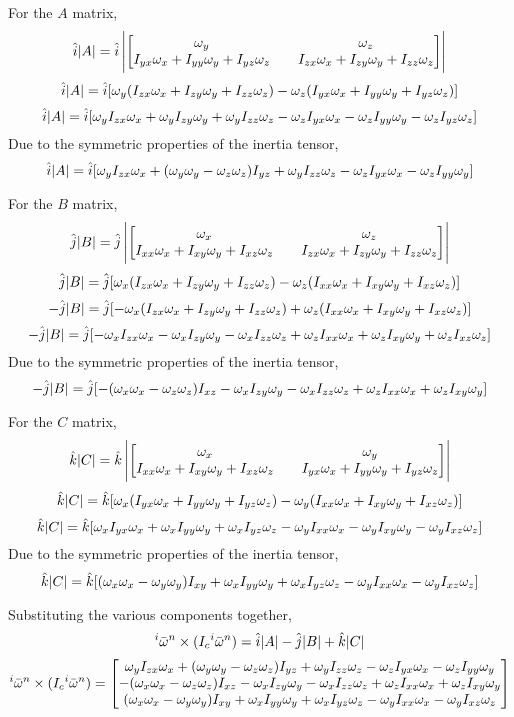 \documentclass[class=report, 12pt, crop=false]{standalone}
\begin{document}
\begin{center}
For the $A$ matrix,
$$\hat{i}|A| = \hat{i}\left|\begin{bmatrix}
\omega_y && \omega_z \\
I_{yx}\omega_x + I_{yy}\omega_y + I_{yz}\omega_z && I_{zx}\omega_x + I_{zy}\omega_y + I_{zz}\omega_z
\end{bmatrix}\right|$$
$$\hat{i}|A| = \hat{i}[\omega_y(I_{zx}\omega_x + I_{zy}\omega_y + I_{zz}\omega_z) - \omega_z(I_{yx}\omega_x + I_{yy}\omega_y + I_{yz}\omega_z)]$$
$$\hat{i}|A| = \hat{i}[\omega_yI_{zx}\omega_x + \omega_yI_{zy}\omega_y + \omega_yI_{zz}\omega_z - \omega_zI_{yx}\omega_x - \omega_zI_{yy}\omega_y - \omega_zI_{yz}\omega_z]$$
Due to the symmetric properties of the inertia tensor,
$$\hat{i}|A| = \hat{i}[\omega_yI_{zx}\omega_x + (\omega_y\omega_y - \omega_z\omega_z)I_{yz} + \omega_yI_{zz}\omega_z - \omega_zI_{yx}\omega_x - \omega_zI_{yy}\omega_y]$$

For the $B$ matrix,
$$\hat{j}|B| = \hat{j}\left|\begin{bmatrix}
\omega_x && \omega_z \\
I_{xx}\omega_x + I_{xy}\omega_y + I_{xz}\omega_z && I_{zx}\omega_x + I_{zy}\omega_y + I_{zz}\omega_z
\end{bmatrix}\right|$$
$$\hat{j}|B| = \hat{j}[\omega_x(I_{zx}\omega_x + I_{zy}\omega_y + I_{zz}\omega_z) - \omega_z(I_{xx}\omega_x + I_{xy}\omega_y + I_{xz}\omega_z)]$$
$$-\hat{j}|B| = \hat{j}[-\omega_x(I_{zx}\omega_x + I_{zy}\omega_y + I_{zz}\omega_z) + \omega_z(I_{xx}\omega_x + I_{xy}\omega_y + I_{xz}\omega_z)]$$
$$-\hat{j}|B| = \hat{j}[-\omega_xI_{zx}\omega_x - \omega_xI_{zy}\omega_y - \omega_xI_{zz}\omega_z + \omega_zI_{xx}\omega_x + \omega_zI_{xy}\omega_y + \omega_zI_{xz}\omega_z]$$
Due to the symmetric properties of the inertia tensor,
$$-\hat{j}|B| = \hat{j}[-(\omega_x\omega_x - \omega_z\omega_z)I_{xz} - \omega_xI_{zy}\omega_y - \omega_xI_{zz}\omega_z + \omega_zI_{xx}\omega_x + \omega_zI_{xy}\omega_y]$$

For the $C$ matrix,
$$\hat{k}|C| = \hat{k}\left|\begin{bmatrix}
\omega_x && \omega_y \\
I_{xx}\omega_x + I_{xy}\omega_y + I_{xz}\omega_z && I_{yx}\omega_x + I_{yy}\omega_y + I_{yz}\omega_z
\end{bmatrix}\right|$$
$$\hat{k}|C| = \hat{k}[\omega_x(I_{yx}\omega_x + I_{yy}\omega_y + I_{yz}\omega_z) - \omega_y(I_{xx}\omega_x + I_{xy}\omega_y + I_{xz}\omega_z)]$$
$$\hat{k}|C| = \hat{k}[\omega_xI_{yx}\omega_x + \omega_xI_{yy}\omega_y + \omega_xI_{yz}\omega_z - \omega_yI_{xx}\omega_x  - \omega_yI_{xy}\omega_y  - \omega_yI_{xz}\omega_z]$$
Due to the symmetric properties of the inertia tensor,
$$\hat{k}|C| = \hat{k}[(\omega_x\omega_x - \omega_y\omega_y)I_{xy} + \omega_xI_{yy}\omega_y + \omega_xI_{yz}\omega_z - \omega_yI_{xx}\omega_x  - \omega_yI_{xz}\omega_z]$$

Substituting the various components together,
$${}^i\bar{\omega}^n\times (I_c {}^i\bar{\omega}^n) = \hat{i}|A| - \hat{j}|B| + \hat{k}|C|$$
$${}^i\bar{\omega}^n\times (I_c {}^i\bar{\omega}^n) = \begin{bmatrix}
\omega_yI_{zx}\omega_x + (\omega_y\omega_y - \omega_z\omega_z)I_{yz} + \omega_yI_{zz}\omega_z - \omega_zI_{yx}\omega_x - \omega_zI_{yy}\omega_y \\
-(\omega_x\omega_x - \omega_z\omega_z)I_{xz} - \omega_xI_{zy}\omega_y - \omega_xI_{zz}\omega_z + \omega_zI_{xx}\omega_x + \omega_zI_{xy}\omega_y \\
(\omega_x\omega_x - \omega_y\omega_y)I_{xy} + \omega_xI_{yy}\omega_y + \omega_xI_{yz}\omega_z - \omega_yI_{xx}\omega_x  - \omega_yI_{xz}\omega_z
\end{bmatrix}$$


\end{center}
\end{document}
